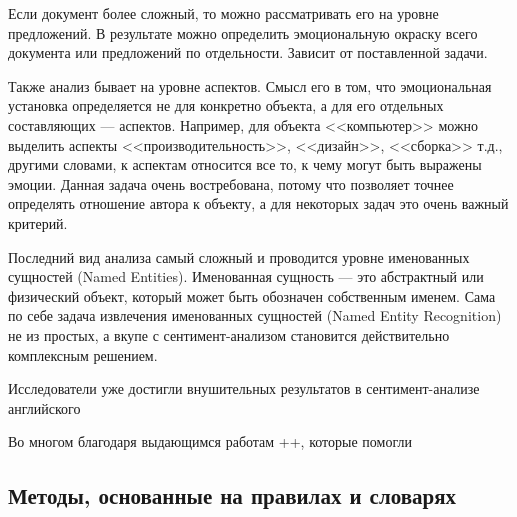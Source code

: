 \bigskip\par
Если документ более сложный, то можно рассматривать его на уровне предложений. В результате можно определить эмоциональную окраску всего документа или предложений по отдельности. Зависит от поставленной задачи.

\bigskip\par
Также анализ бывает на уровне аспектов. Смысл его в том, что эмоциональная установка определяется не для конкретно объекта, а для его отдельных составляющих --- аспектов. Например, для объекта <<компьютер>> можно выделить аспекты <<производительность>>, <<дизайн>>, <<сборка>> т.д., другими словами, к аспектам относится все то, к чему могут быть выражены эмоции. Данная задача очень востребована, потому что позволяет точнее определять отношение автора к объекту, а для некоторых задач это очень важный критерий.

\bigskip\par
Последний вид анализа самый сложный и проводится уровне именованных сущностей (Named Entities). Именованная сущность --- это абстрактный или физический объект, который может быть обозначен собственным именем. Сама по себе задача извлечения именованных сущностей (Named Entity Recognition) не из простых, а вкупе с сентимент-анализом становится действительно комплексным решением.










Исследователи уже достигли внушительных результатов в сентимент-анализе английского






Во многом благодаря выдающимся работам ++, которые помогли




\subsection{Методы, основанные на правилах и словарях}












































